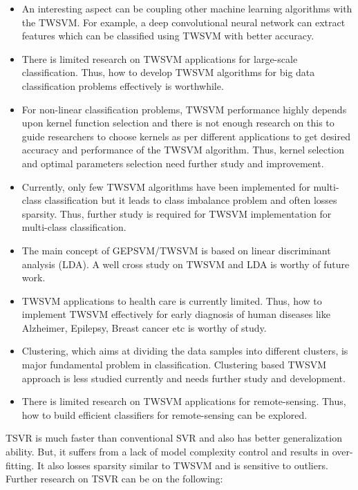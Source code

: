 \documentclass[pdflatex,sn-mathphys]{sn-jnl}%
\theoremstyle{thmstyleone}%
\theoremstyle{thmstyletwo}%
\theoremstyle{thmstylethree}%
\begin{document}
\begin{itemize}
    \item An interesting aspect can be coupling other machine learning algorithms with the TWSVM. For example, a deep convolutional neural network can extract features which can be classified using TWSVM with better accuracy.

    \item There is limited research on TWSVM applications for large-scale classification. Thus, how to develop TWSVM algorithms for big data classification problems effectively is worthwhile.

     \item For non-linear classification problems, TWSVM performance highly depends upon kernel function selection and there is not enough research on this to guide researchers to choose kernels as per different applications to get desired accuracy and performance of the TWSVM algorithm. Thus, kernel selection and optimal parameters selection need further study and improvement. 

    \item Currently, only few TWSVM algorithms have been implemented for multi-class classification but it leads to class imbalance problem and often losses sparsity. Thus, further study is required for TWSVM implementation for multi-class classification.
    \item The main concept of GEPSVM/TWSVM is based on linear discriminant analysis (LDA). A well cross study on TWSVM and LDA is worthy of future work.
    
    \item
   TWSVM applications to health care is currently limited. Thus, how to implement TWSVM effectively for early diagnosis of human diseases like Alzheimer, Epilepsy, Breast cancer etc is worthy of study.
   \item
   Clustering, which aims at dividing the data samples into different clusters, is major fundamental problem in classification. Clustering based TWSVM approach is less studied currently and needs further study and development.
  \item
  There is limited research on TWSVM applications for remote-sensing. Thus, how to build efficient classifiers for remote-sensing can be explored.


    \end{itemize}
    
TSVR is much faster than conventional SVR and also has better generalization ability. But, it suffers from a lack of model complexity control and results in over-fitting. It also losses sparsity similar to TWSVM and is sensitive to outliers. Further research on TSVR can be on the following:
\end{document}
